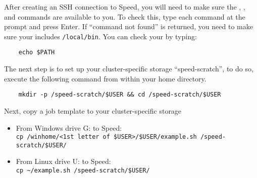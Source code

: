 
After creating an SSH connection to Speed, you will need to
make sure the , , and 
commands are available to you.
To check this, type each command at the prompt and press Enter.
If ``command not found'' is returned, you need to make sure your  
includes \texttt{/local/bin}.
You can check your  by typing:
\begin{verbatim}
    echo $PATH
\end{verbatim}

%
%
%
%
%
%

\noindent The next step is to set up your cluster-specific storage ``speed-scratch'', to do so, execute the following command from within your
home directory. 
\begin{verbatim}
    mkdir -p /speed-scratch/$USER && cd /speed-scratch/$USER
\end{verbatim}

\noindent Next, copy a job template to your cluster-specific storage
\begin{itemize}
    \item From Windows drive G: to Speed:\\ 
    \verb|cp /winhome/<1st letter of $USER>/$USER/example.sh /speed-scratch/$USER/|
    \item From Linux drive U: to Speed:\\
    \verb|cp ~/example.sh /speed-scratch/$USER/|
\end{itemize}


